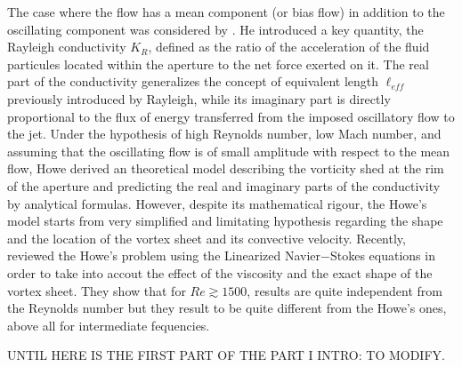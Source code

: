 \documentclass{jfm}
\begin{document}
The case where the flow has a mean component (or bias flow) in addition to the oscillating component was considered by \citet{howe1979theory}. He introduced a key quantity, the Rayleigh conductivity $K_R$, defined as the ratio of the acceleration of the fluid particules located within the aperture to the net force exerted on it. The real part of the conductivity generalizes the concept of equivalent length $\ell_{eff}$ previously introduced by Rayleigh, while its imaginary part is directly proportional to the flux of energy transferred from the imposed oscillatory flow to the jet. Under the hypothesis of high Reynolds number, low Mach number, and assuming that the oscillating flow is of small amplitude with respect to the mean flow, Howe derived an theoretical model describing the vorticity shed at the rim of the aperture and predicting the real and imaginary parts of the conductivity by analytical formulas. However, despite its mathematical rigour, the Howe's model starts from very simplified and limitating hypothesis regarding the shape and the location of the vortex sheet and its convective velocity. Recently, \citet{fabre2018} reviewed the Howe's problem using the Linearized Navier$-$Stokes equations in order to take into accout the effect of the viscosity and the exact shape of the vortex sheet. They show that for $Re \gtrsim 1500$, results are quite independent from the Reynolds number but they result to be quite different from the Howe's ones, above all for intermediate fequencies. 

UNTIL HERE IS THE FIRST PART OF THE PART I INTRO: TO MODIFY.
\end{document}
